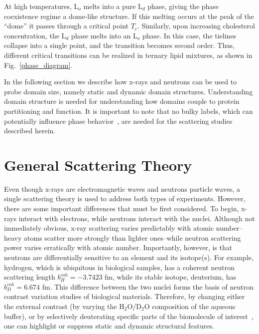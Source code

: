 \documentclass[8.5pt,twoside,twocolumn]{article}
\begin{document}
At high temperatures, L$_o$ melts into a pure L$_d$ phase, giving the phase coexistence regime a dome-like structure. If this melting occurs at the peak of the ``dome'' it passes through a critical point $T_c$. Similarly, upon increasing cholesterol concentration, the L$_d$ phase melts into an L$_o$ phase. In this case, the tielines collapse into a single point, and the transition becomes second order. Thus, different critical transitions can be realized in ternary lipid mixtures, as shown in Fig.~\ref{phase_diagram}.

In the following section we describe how x-rays and neutrons can be used to probe domain size, namely static and dynamic domain structures. Understanding domain structure is needed for understanding how domains couple to protein partitioning and function. It is important to note that no bulky labels, which can potentially influence phase behavior~\cite{Ayuyan.2006,Zhao.2007,Veatch.2007}, are needed for the scattering studies described herein.

\section{General Scattering Theory}

Even though x-rays are electromagnetic waves and neutrons particle waves, a single scattering theory is used to address both types of experiments. However, there are some important differences that must be first considered. To begin, x-rays interact with electrons, while neutrons interact with the nuclei. Although not immediately obvious, x-ray scattering varies predictably with atomic number--heavy atoms scatter more strongly than lighter ones--while neutron scattering power varies erratically with atomic number. Importantly, however, is that neutrons are differentially sensitive to an element and its isotope(s). For example, hydrogen, which is ubiquitous in biological samples, has a coherent neutron scattering length $b_H^{coh} = -3.7423$ fm, while its stable isotope, deuterium, has $b_D^{coh} = 6.674$ fm. This difference between the two nuclei forms the basis of neutron contrast variation studies of biological materials. Therefore, by changing either the external contrast (by varying the H$_2$O/D$_2$O composition of the aqueous buffer), or by selectively deuterating specific parts of the biomolecule of interest~\cite{Fitter.2006}, one can highlight or suppress static and dynamic structural features. 
\end{document}
